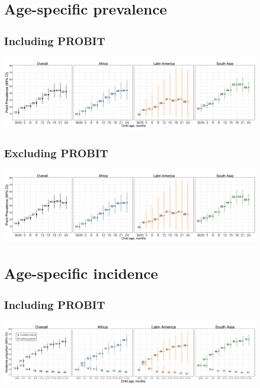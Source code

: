 \documentclass[9pt,]{book}
\begin{document}
\hypertarget{age-specific-prevalence-1}{%
\section{Age-specific prevalence}\label{age-specific-prevalence-1}}

\hypertarget{including-probit-1}{%
\subsection{Including PROBIT}\label{including-probit-1}}

\includegraphics[width=58.33in]{figure-copies/fig-stunt-2-prev-overall_region--allage-primary}

\hypertarget{excluding-probit-1}{%
\subsection{Excluding PROBIT}\label{excluding-probit-1}}

\includegraphics[width=58.33in]{figure-copies/fig-stunt-2-prev-overall_region--allage-primary_no_probit}

\hypertarget{age-specific-incidence-1}{%
\section{Age-specific incidence}\label{age-specific-incidence-1}}

\hypertarget{including-probit-2}{%
\subsection{Including PROBIT}\label{including-probit-2}}

\includegraphics[width=66.67in]{figure-copies/fig-stunt-2-inc-overall_region--allage-primary}
\end{document}
